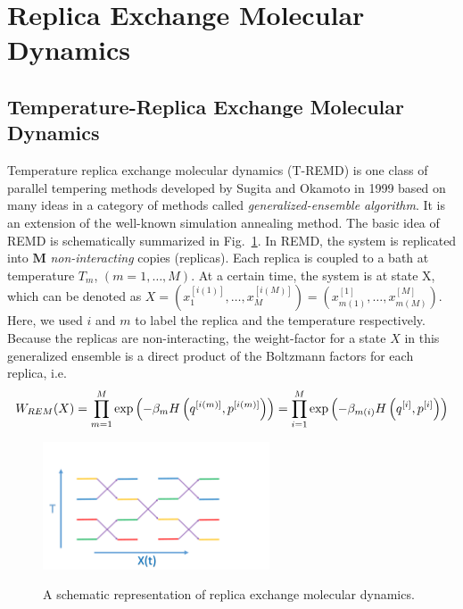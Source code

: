 \section{Replica Exchange Molecular Dynamics\label{Sec:ES:REMD}}
\subsection{Temperature-Replica Exchange Molecular Dynamics}
Temperature replica exchange molecular dynamics (T-REMD) is one class of parallel tempering methods developed by Sugita and Okamoto in 1999\cite{SugitaCPL1999} based on many ideas in a category of methods called \textit{generalized-ensemble algorithm}. It is an extension of the well-known simulation annealing method. The basic idea of REMD is schematically summarized in Fig.~\ref{Fig:ES:REMD}. In REMD, the system is replicated into $\mathbf{M}$ \textit{non-interacting} copies (replicas). Each replica is coupled to a bath at temperature $T_m$, $(m=1,\dots,M)$. At a certain time, the system is at state X, which can be denoted as $X=\left(x_1^{[i(1)]},\dots,x_M^{[i(M)]}\right)=\left(x_{m(1)}^{[1]},\dots,x_{m(M)}^{[M]}\right)$. Here, we used $i$ and $m$ to label the replica and the temperature respectively. Because the replicas are non-interacting, the weight-factor for a state $X$ in this generalized ensemble is a direct product of the Boltzmann factors for each replica, i.e.
\begin{equation}
	W_{REM}(X)=\prod\limits_{m=1}^M\exp{\left(-\beta_m H\left(q^{[i(m)]},p^{[i(m)]}\right)\right)}=\prod\limits_{i=1}^M \exp{\left(-\beta_{m(i)}H\left(q^{[i]},p^{[i]}\right)\right)}\textsl{}
\end{equation}

\begin{figure}[htbp]
    \centering
	\includegraphics[width=0.6\textwidth]{figures/REMD.pdf}\\
	\caption{A schematic representation of replica exchange molecular dynamics.}\label{Fig:ES:REMD}
\end{figure}

